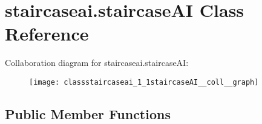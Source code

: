 \hypertarget{classstaircaseai_1_1staircaseAI}{\section{staircaseai.\-staircase\-A\-I Class Reference}
\label{classstaircaseai_1_1staircaseAI}
}


Collaboration diagram for staircaseai.\-staircase\-A\-I\-:
\nopagebreak
\begin{figure}[H]
\begin{center}
\leavevmode
\texttt{[image: classstaircaseai\_1\_1staircaseAI\_\_coll\_\_graph]}
\end{center}
\end{figure}
\subsection*{Public Member Functions}
